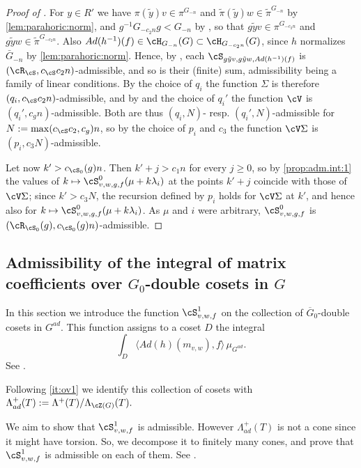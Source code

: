 \documentclass[12pt,a4paper]{amsart}%
\newcommand{\claude}[1]{{{#1}}}
\newcommand{\RamiE}[1]{{{#1}}}
\begin{document}
\begin{proof}[Proof of ]
For $y\in R'$ we have $\pi(\tilde y)v\in \pi^{G_{-n}}$ and $\tilde\pi(\tilde y)w\in\tilde\pi^{G_{-n}}$ by \eqref{lem:parahoric:norm}, and $g^{-1}G_{-c_2n}g<G_{-n}$ by , so that $g\tilde yv\in\pi^{G_{-c_2n}}$ and $g\tilde yw\in\tilde\pi^{G_{-c_2n}}$. Also $Ad(h^{-1})(f)\in\cH_{G_{-n}}(G)\subset \cH_{G_{-c_2n}}(G)$, since $h$ normalizes $\bar G_{-n}$ by \eqref{lem:parahoric:norm}. Hence, by , each $\cS_{g\tilde yv,g\tilde yw,Ad(h^{-1})(f)}$ is $(\cR_\cS,c_\cS c_2n)$-admissible, and so is their (finite) sum, admissibility being a family of linear conditions. By the choice of $q_i$ the function $\Sigma$ is therefore $(q_i,c_\cS c_2n)$-admissible, and by  and the choice of $q_i'$ the function $\cV$ is $(q_i',c_gn)$-admissible. Both are thus $(q_i,N)$- resp. $(q_i',N)$-admissible for $N:=\max(c_\cS c_2,c_g)n$, so by the choice of $p_i$ and $c_3$ the function $\cV\Sigma$ is $(p_i,c_3N)$-admissible.

Let now $k'>c_{\cS_0}(g)n$. Then $k'+j>c_1n$ for every $j\geq0$, so by \eqref{prop:adm.int:1} the values of $k\mapsto \cS^0_{v,w,g,f}(\mu+k\lambda_i)$ at the points $k'+j$ coincide with those of $\cV\Sigma$; since $k'>c_3N$, the recursion defined by $p_i$ holds for $\cV\Sigma$ at $k'$, and hence also for $k\mapsto \cS^0_{v,w,g,f}(\mu+k\lambda_i)$. As $\mu$ and $i$ were arbitrary, $\cS^0_{v,w,g,f}$ is $(\cR_{\cS_0}(g),c_{\cS_0}(g)n)$-admissible.
\end{proof}

\subsection{Admissibility of the integral of matrix coefficients over $G_0$-double cosets in $G$}\label{ssec:avg.G}
\RamiE{In this section we introduce the function $\cS^1_{v,w,f}$ on the collection of $\overline G_0$-\claude{double} cosets \claude{in} $G^{ad}$. This function \claude{assigns} to a coset $D$ the integral 
$$\int_{D} \langle Ad(h)(m_{v,w}),f\rangle \,\mu_{G^{ad}}.$$ See \Cref{not:S1}.

\claude{Following} \Cref{not:settings}\eqref{it:ov1} we \claude{identify} \claude{this} collection of cosets with 
${\Lambda^+_{ad}(T)}:=\Lambda^+(T)/        {\Lambda_{\cZ(G)}(T)}.$

We aim to show that $\cS^1_{v,w,f}$ is \claude{admissible}. However ${\Lambda^+_{ad}(T)}$ is \claude{not} a cone since it might have \claude{torsion}. So, we decompose it to \claude{finitely} many cones, and prove that $\cS^1_{v,w,f}$ is \claude{admissible} on each of them. See \Cref{prop:S1.adm}.
} 
\end{document}

